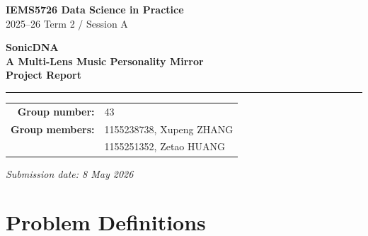 \documentclass[11pt,a4paper]{article}
\begin{document}
\begin{titlepage}
  \thispagestyle{empty}
  \centering

  \vspace*{1.6cm}

  {\Large\bfseries IEMS5726 Data Science in Practice}\\[6pt]
  {\normalsize 2025--26 Term 2 / Session A}

  \vspace{2.6cm}

  {\fontsize{26pt}{31pt}\selectfont\bfseries
   SonicDNA}\\[10pt]

  {\fontsize{18pt}{22pt}\selectfont\bfseries
   A Multi-Lens Music Personality Mirror}\\[1.4cm]

  {\large\bfseries Project Report}

  \vspace{1.2cm}
  \rule{0.68\linewidth}{0.45pt}
  \vspace{1.0cm}

  \begin{tabular}{rl}
    \textbf{Group number:} & 43 \\[5pt]
    \textbf{Group members:} & 1155238738, Xupeng ZHANG \\[3pt]
                            & 1155251352, Zetao HUANG \\
  \end{tabular}

  \vfill

  {\normalsize\textit{Submission date: 8 May 2026}}

  \vspace*{1.2cm}

\end{titlepage}

\tableofcontents

\section{Problem Definitions}
\end{document}
